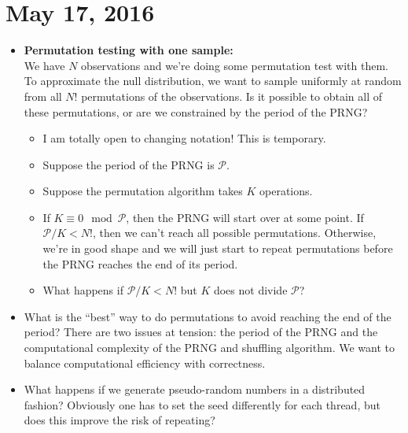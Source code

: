 \documentclass[12pt]{article}
\begin{document}
\section{May 17, 2016}
\begin{itemize}
\item \textbf{Permutation testing with one sample:} \\
We have $N$ observations and we're doing some permutation test with them.
To approximate the null distribution, we want to sample uniformly at random from all $N!$ permutations of the observations.
Is it possible to obtain all of these permutations, or are we constrained by the period of the PRNG?
\begin{itemize}
\item I am totally open to changing notation! This is temporary.
\item Suppose the period of the PRNG is $\mathcal{P}$.
\item Suppose the permutation algorithm takes $K$ operations.
\item If $K \equiv 0 \mod \mathcal{P}$, then the PRNG will start over at some point. If $\mathcal{P}/K < N!$, then we can't reach all possible permutations.
Otherwise, we're in good shape and we will just start to repeat permutations before the PRNG reaches the end of its period.
\item What happens if $\mathcal{P}/K < N!$ but $K$ does not divide $\mathcal{P}$?
\end{itemize}
\item What is the ``best'' way to do permutations to avoid reaching the end of the period?
There are two issues at tension: the period of the PRNG and the computational complexity of the PRNG and shuffling algorithm.
We want to balance computational efficiency with correctness.
\item What happens if we generate pseudo-random numbers in a distributed fashion?
Obviously one has to set the seed differently for each thread, but does this improve the risk of repeating?
\end{itemize}



\end{document}
